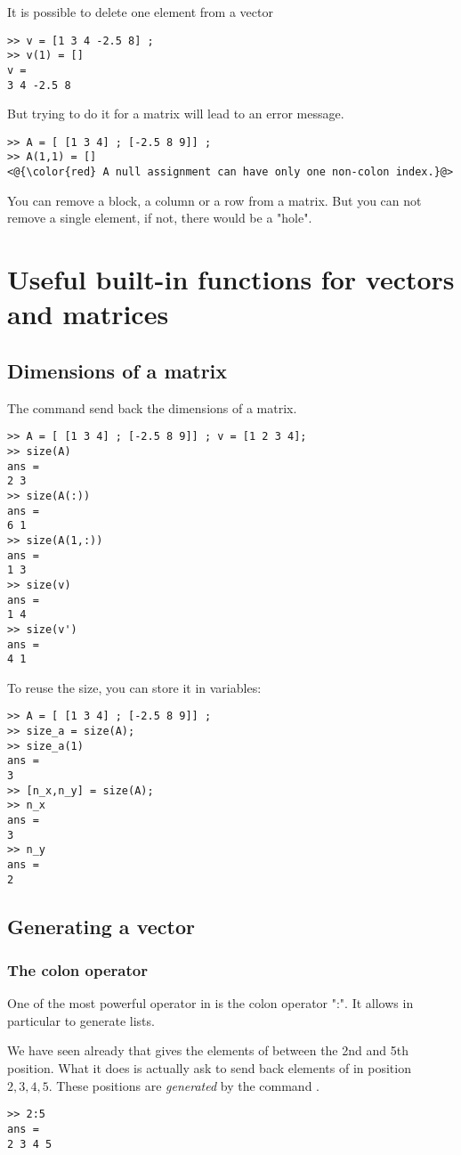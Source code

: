 It is possible to delete one element from a vector 

\begin{lstlisting}
>> v = [1 3 4 -2.5 8] ;
>> v(1) = []
v = 
3 4 -2.5 8
\end{lstlisting}

But trying to do it for a matrix will lead to an error message.
\begin{lstlisting}
>> A = [ [1 3 4] ; [-2.5 8 9]] ;
>> A(1,1) = []
<@{\color{red} A null assignment can have only one non-colon index.}@>
\end{lstlisting}

You can remove a block, a column or a row from a matrix. 
But you can not remove a single element, if not, there would be a "hole".


\section{Useful built-in functions for vectors and matrices}
\subsection{Dimensions of a matrix}
The command  send back the dimensions of a matrix.
\begin{lstlisting}
>> A = [ [1 3 4] ; [-2.5 8 9]] ; v = [1 2 3 4];
>> size(A)
ans = 
2 3
>> size(A(:))
ans =
6 1
>> size(A(1,:))
ans =
1 3
>> size(v)
ans = 
1 4
>> size(v')
ans = 
4 1
\end{lstlisting}
To reuse the size, you can store it in variables:
\begin{lstlisting}
>> A = [ [1 3 4] ; [-2.5 8 9]] ; 
>> size_a = size(A);
>> size_a(1)
ans =
3
>> [n_x,n_y] = size(A);
>> n_x
ans = 
3
>> n_y
ans = 
2
\end{lstlisting}


\subsection{Generating a vector}

\subsubsection{The colon operator}
\label{sssec-colon}
One of the most powerful operator in \matlab is the colon operator ":".
It allows in particular to generate lists.

We have seen already that  gives the elements of  between the 2nd and 5th position.
What it does is actually ask \matlab to send back elements of  in position $2,3,4,5$.
These positions are \emph{generated} by the command .
\begin{lstlisting}
>> 2:5
ans = 
2 3 4 5
\end{lstlisting}

